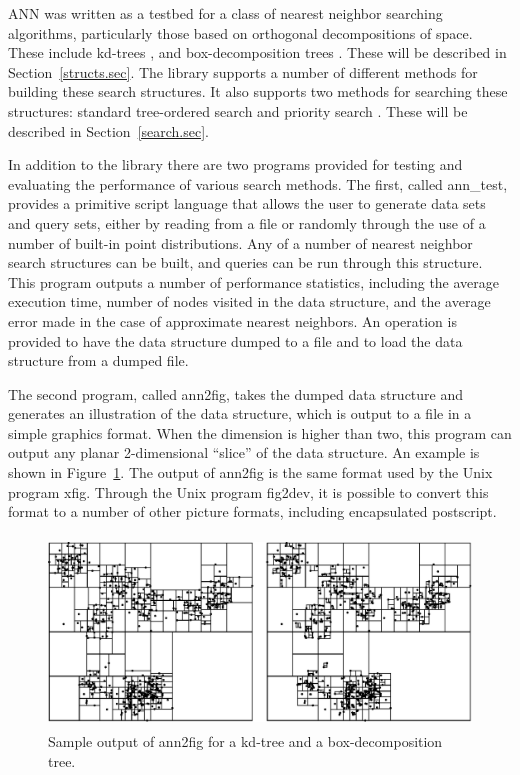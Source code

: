 \documentclass[11pt]{article}		%
\newcommand{\ANN}[0]{\textsf{ANN}}
\newcommand{\anntest}[0]{\textsf{ann\_test}}
\newcommand{\annfig}[0]{\textsf{ann2fig}}
\begin{document}
{\ANN} was written as a testbed for a class of nearest neighbor
searching algorithms, particularly those based on orthogonal
decompositions of space.  These include kd-trees \cite{Ben90,FBF77}, and
box-decomposition trees \cite{AMN98}.  These will be described in
Section~\ref{structs.sec}.  The library supports a number of different
methods for building these search structures.  It also supports two
methods for searching these structures: standard tree-ordered search
\cite{ArM93b} and priority search \cite{AMN98}.  These will be described
in Section~\ref{search.sec}.

In addition to the library there are two programs provided for testing
and evaluating the performance of various search methods.  The first,
called {\anntest}, provides a primitive script language that allows the
user to generate data sets and query sets, either by reading from a file
or randomly through the use of a number of built-in point distributions.
Any of a number of nearest neighbor search structures can be built, and
queries can be run through this structure.  This program outputs a
number of performance statistics, including the average execution time,
number of nodes visited in the data structure, and the average error
made in the case of approximate nearest neighbors.  An operation is
provided to have the data structure dumped to a file and to load the
data structure from a dumped file.

The second program, called {\annfig}, takes the dumped data structure
and generates an illustration of the data structure, which is output to
a file in a simple graphics format.  When the dimension is higher than
two, this program can output any planar 2-dimensional ``slice'' of the
data structure.  An example is shown in Figure~\ref{ann.fig}.  The
output of {\annfig} is the same format used by the Unix program xfig.
Through the Unix program \textsf{fig2dev}, it is possible to convert
this format to a number of other picture formats, including encapsulated
postscript.

\begin{figure}[htbp]
  \centerline{\includegraphics[height=2.0in]{Figs/ann.eps}}
  \caption{Sample output of {\annfig} for a kd-tree and a
  box-decomposition tree.}
  \label{ann.fig}
\end{figure}
\end{document}

